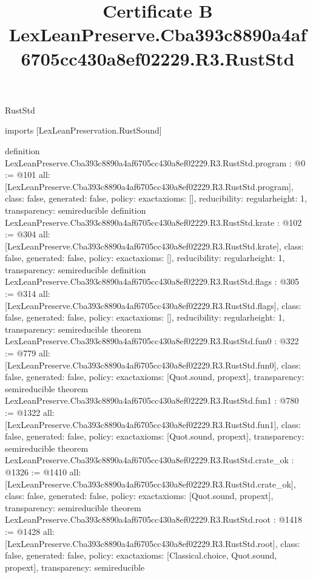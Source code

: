 \begin{lexlean}{RustStd}
\title{Certificate B LexLeanPreserve.Cba393c8890a4af6705cc430a8ef02229.R3.RustStd}
\begin{coremodule}
imports [LexLeanPreservation.RustSound]

definition LexLeanPreserve.Cba393c8890a4af6705cc430a8ef02229.R3.RustStd.program : @0 := @101 {
  all: [LexLeanPreserve.Cba393c8890a4af6705cc430a8ef02229.R3.RustStd.program],
  class: false,
  generated: false,
  policy: exact{axioms: []},
  reducibility: regular{height: 1},
  transparency: semireducible
}
definition LexLeanPreserve.Cba393c8890a4af6705cc430a8ef02229.R3.RustStd.krate : @102 := @304 {
  all: [LexLeanPreserve.Cba393c8890a4af6705cc430a8ef02229.R3.RustStd.krate],
  class: false,
  generated: false,
  policy: exact{axioms: []},
  reducibility: regular{height: 1},
  transparency: semireducible
}
definition LexLeanPreserve.Cba393c8890a4af6705cc430a8ef02229.R3.RustStd.flags : @305 := @314 {
  all: [LexLeanPreserve.Cba393c8890a4af6705cc430a8ef02229.R3.RustStd.flags],
  class: false,
  generated: false,
  policy: exact{axioms: []},
  reducibility: regular{height: 1},
  transparency: semireducible
}
theorem LexLeanPreserve.Cba393c8890a4af6705cc430a8ef02229.R3.RustStd.fun0 : @322 := @779 {
  all: [LexLeanPreserve.Cba393c8890a4af6705cc430a8ef02229.R3.RustStd.fun0],
  class: false,
  generated: false,
  policy: exact{axioms: [Quot.sound, propext]},
  transparency: semireducible
}
theorem LexLeanPreserve.Cba393c8890a4af6705cc430a8ef02229.R3.RustStd.fun1 : @780 := @1322 {
  all: [LexLeanPreserve.Cba393c8890a4af6705cc430a8ef02229.R3.RustStd.fun1],
  class: false,
  generated: false,
  policy: exact{axioms: [Quot.sound, propext]},
  transparency: semireducible
}
theorem LexLeanPreserve.Cba393c8890a4af6705cc430a8ef02229.R3.RustStd.crate_ok : @1326 := @1410 {
  all: [LexLeanPreserve.Cba393c8890a4af6705cc430a8ef02229.R3.RustStd.crate_ok],
  class: false,
  generated: false,
  policy: exact{axioms: [Quot.sound, propext]},
  transparency: semireducible
}
theorem LexLeanPreserve.Cba393c8890a4af6705cc430a8ef02229.R3.RustStd.root : @1418 := @1428 {
  all: [LexLeanPreserve.Cba393c8890a4af6705cc430a8ef02229.R3.RustStd.root],
  class: false,
  generated: false,
  policy: exact{axioms: [Classical.choice, Quot.sound, propext]},
  transparency: semireducible
}


\end{coremodule}
\end{lexlean}
